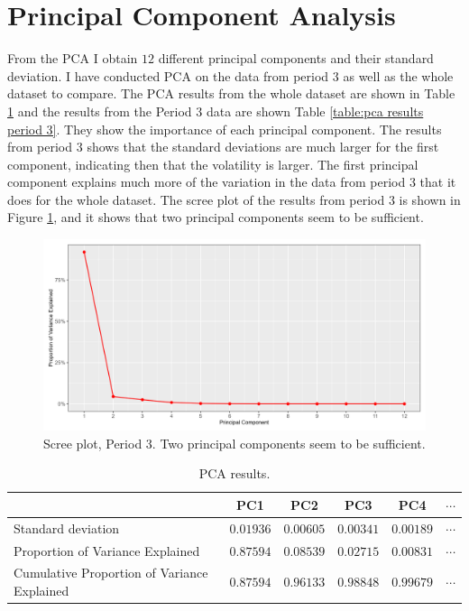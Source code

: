 


\section{Principal Component Analysis}

\noindent From the PCA I obtain $12$ different principal components and their standard deviation. I have conducted PCA on the data from period $3$ as well as the whole dataset to compare. The PCA results from the whole dataset are shown in Table \ref{table:pca results} and the results from the Period $3$ data are shown Table \ref{table:pca results period 3}. They show the importance of each principal component. The results from period $3$ shows that the standard deviations are much larger for the first component, indicating then that the volatility is larger. The first principal component explains much more of the variation in the data from period 3 that it does for the whole dataset. The scree plot of the results from period $3$ is shown in Figure \ref{fig:scree plot period 3}, and it shows that two principal components seem to be sufficient. 

\begin{figure}[!htbp]
    \centering
    \includegraphics[width=.95\linewidth]{Figures/Scree Plot/zero_coupon_yields_phase_3_scree_plot.png}
    \caption[Scree plot, Period 3.]{Scree plot, Period 3. Two principal components seem to be sufficient.}
    \label{fig:scree plot period 3}
\end{figure}

\newpage

\begin{table}[!htbp]
\centering
\begin{tabular}{|m{9em}|c|c|c|c|c|} 
\cline{2-6}
\multicolumn{1}{c|}{} & PC1 & PC2 & PC3 & PC4 & $\cdots$ \\ \hline
Standard deviation & $0.01936$ & $0.00605$ & $0.00341$ & $0.00189$ & $\cdots$ \\ \hline
Proportion of Variance Explained & $0.87594$ & $0.08539$ & $0.02715$ & $0.00831$ & $\cdots$ \\
\hline
Cumulative Proportion of Variance Explained & $0.87594$ & $0.96133$ & $0.98848$ & $0.99679$ & $\cdots$ \\
\hline
\end{tabular}
\caption[PCA results]{PCA results.}
\label{table:pca results}
\end{table}

